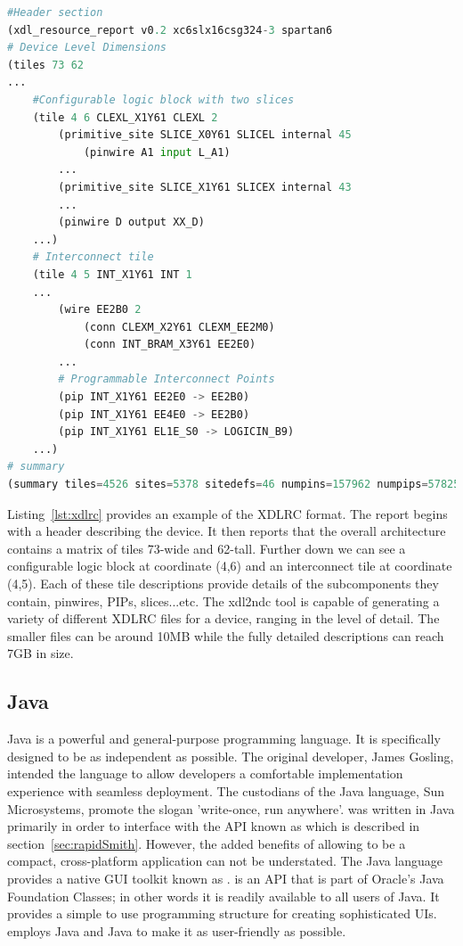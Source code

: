 \ConditionSize
\begin{lstlisting}[label={lst:xdlrc}, language=Python, caption={A hierarchical XDLRC resource description of a Spartan 6 FPGA consisting of a header, a tile section, and a trailing device summary~\cite{xdlTutorial}}]
#Header section
(xdl_resource_report v0.2 xc6slx16csg324-3 spartan6
# Device Level Dimensions
(tiles 73 62
...
	#Configurable logic block with two slices
	(tile 4 6 CLEXL_X1Y61 CLEXL 2
		(primitive_site SLICE_X0Y61 SLICEL internal 45
			(pinwire A1 input L_A1)
		...
		(primitive_site SLICE_X1Y61 SLICEX internal 43
		...
		(pinwire D output XX_D)
	...)
	# Interconnect tile
	(tile 4 5 INT_X1Y61 INT 1
	...
		(wire EE2B0 2
			(conn CLEXM_X2Y61 CLEXM_EE2M0)
			(conn INT_BRAM_X3Y61 EE2E0)
		...
		# Programmable Interconnect Points
		(pip INT_X1Y61 EE2E0 -> EE2B0)
		(pip INT_X1Y61 EE4E0 -> EE2B0)
		(pip INT_X1Y61 EL1E_S0 -> LOGICIN_B9)
	...)
# summary
(summary tiles=4526 sites=5378 sitedefs=46 numpins=157962 numpips=5782505))
\end{lstlisting}
\normalsize

Listing~\ref{lst:xdlrc} provides an example of the XDLRC format.
The report begins with a header describing the device.
It then reports that the overall architecture contains a matrix of tiles 73-wide and 62-tall.
Further down we can see a configurable logic block at coordinate (4,6) and an interconnect tile at coordinate (4,5).
Each of these tile descriptions provide details of the subcomponents they contain, pinwires, \acrshort{PIP}s, slices...etc.
The \gls{xdl2ndc} tool is capable of generating a variety of different XDLRC files for a device, ranging in the level of detail.
The smaller files can be around 10MB while the fully detailed descriptions can reach 7GB in size.
\subsection{Java} \label{sec:java}
Java is a powerful and general-purpose programming language. 
It is specifically designed to be as independent as possible.
The original developer, James Gosling, intended the language to allow developers a comfortable implementation experience with seamless deployment. 
The custodians of the Java language, Sun Microsystems, promote the slogan 'write-once, run anywhere'.  
\NameNoPeriod was written in Java primarily in order to interface with the \acrshort{API} known as \RapidSmith which is described in section~\ref{sec:rapidSmith}.
However, the added benefits of allowing \NameNoPeriod to be a compact, cross-platform application can not be understated.
The Java language provides a native \acrfull{GUI} toolkit known as \SwingEnd.
\Swing is an \acrshort{API} that is part of Oracle's Java Foundation Classes; in other words it is readily available to all users of Java.
It provides a simple to use programming structure for creating sophisticated \acrshort{UIs}.
\NameNoPeriod employs Java and Java \Swing to make it as user-friendly as possible. 

